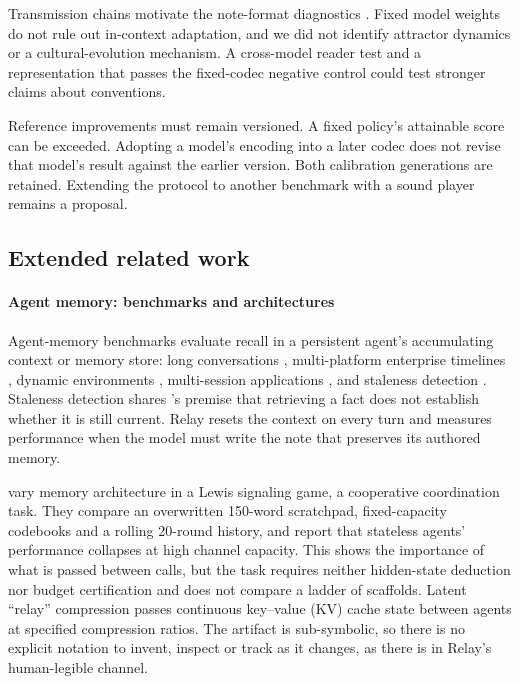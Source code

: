 Transmission chains motivate the note-format diagnostics \citep{kirby2001,kirby2008,acerbi2023,telephone2024,brokentelephone2025}. Fixed model weights do not rule out in-context adaptation, and we did not identify attractor dynamics or a cultural-evolution mechanism. A cross-model reader test and a representation that passes the fixed-codec negative control could test stronger claims about conventions.

Reference improvements must remain versioned. A fixed policy's attainable score can be exceeded. Adopting a model's encoding into a later codec does not revise that model's result against the earlier version. Both calibration generations are retained. Extending the protocol to another benchmark with a sound player remains a proposal.

\subsection{Extended related work}\label{app:related}

\paragraph{Agent memory: benchmarks and architectures}
Agent-memory benchmarks evaluate recall in a persistent agent's accumulating context or memory store: long conversations \citep{locomo2024}, multi-platform enterprise timelines \citep{memtrack2025}, dynamic environments \citep{gaia226,evoarena2026}, multi-session applications \citep{memoryarena2026,memgym2026}, and staleness detection \citep{stale2026}. Staleness detection shares \blindboard's premise that retrieving a fact does not establish whether it is still current. Relay resets the context on every turn and measures performance when the model must write the note that preserves its authored memory.

\citet{signals2026} vary memory architecture in a Lewis signaling game, a cooperative coordination task. They compare an overwritten 150-word scratchpad, fixed-capacity codebooks and a rolling 20-round history, and report that stateless agents' performance collapses at high channel capacity. This shows the importance of what is passed between calls, but the task requires neither hidden-state deduction nor budget certification and does not compare a ladder of scaffolds. Latent ``relay'' compression \citep{kvrelay2026} passes continuous key--value (KV) cache state between agents at specified compression ratios. The artifact is sub-symbolic, so there is no explicit notation to invent, inspect or track as it changes, as there is in Relay's human-legible channel.

